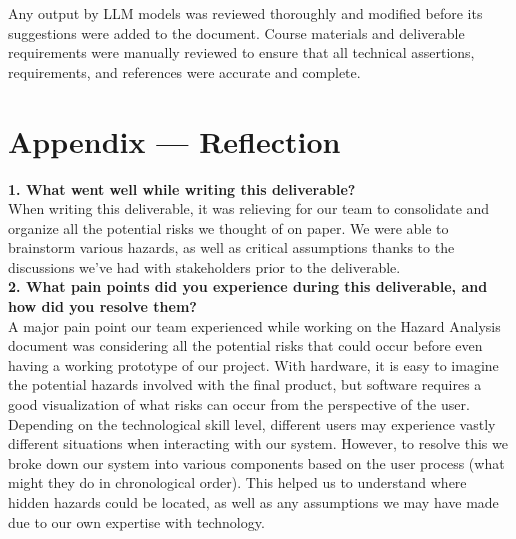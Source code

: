 \documentclass{article}
\begin{document}
Any output by LLM models was reviewed thoroughly and modified before its suggestions were added to the document. Course materials and deliverable requirements were manually reviewed to ensure that all technical assertions, requirements, and references were accurate and complete.

\newpage{}

\section{Appendix --- Reflection}


%

\noindent \textbf{1. What went well while writing this deliverable?}\\

\noindent When writing this deliverable, it was relieving for our team to consolidate and organize all 
the potential risks we thought of on paper. We were able to  brainstorm various hazards, as 
well as critical assumptions thanks to the discussions we've had with stakeholders prior to 
the deliverable.\\


\noindent \textbf{2. What pain points did you experience during this deliverable, and how
did you resolve them?}\\

\noindent A major pain point our team experienced while working on the Hazard Analysis document was 
considering all the potential risks that could occur before even having a working prototype 
of our project. With hardware, it is easy to imagine the potential hazards involved with the 
final product, but software requires a good visualization of what risks can occur from the 
perspective of the user. Depending on the technological skill level, different users may 
experience vastly different situations when interacting with our system. However, to resolve 
this we broke down our system into various components based on the user process (what might 
they do in chronological order). This helped us to understand where hidden hazards could be 
located, as well as any assumptions we may have made due to our own expertise with technology.\\
\end{document}
